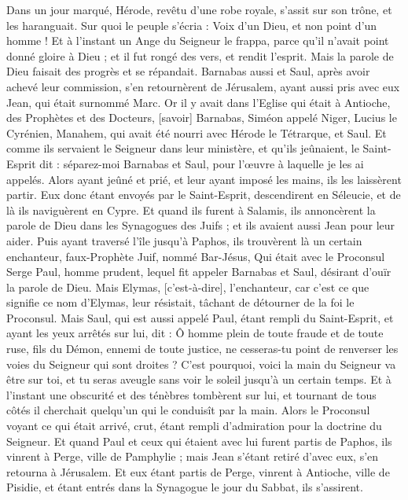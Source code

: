 \begin{multicols}{2}
Dans un jour marqué, Hérode, revêtu d'une robe royale, s'assit sur son trône, et les haranguait.
Sur quoi le peuple s'écria : Voix d'un Dieu, et non point d'un homme !
Et à l'instant un Ange du Seigneur le frappa, parce qu'il n'avait point donné gloire à Dieu ; et il fut rongé des vers, et rendit l'esprit.
Mais la parole de Dieu faisait des progrès et se répandait.
Barnabas aussi et Saul, après avoir achevé leur commission, s'en retournèrent de Jérusalem, ayant aussi pris avec eux Jean, qui était surnommé Marc.
\VerseOne{}Or il y avait dans l'Eglise qui était à Antioche, des Prophètes et des Docteurs, [savoir] Barnabas, Siméon appelé Niger, Lucius le Cyrénien, Manahem, qui avait été nourri avec Hérode le Tétrarque, et Saul.
Et comme ils servaient le Seigneur dans leur ministère, et qu'ils jeûnaient, le Saint-Esprit dit : séparez-moi Barnabas et Saul, pour l'œuvre à laquelle je les ai appelés.
Alors ayant jeûné et prié, et leur ayant imposé les mains, ils les laissèrent partir.
Eux donc étant envoyés par le Saint-Esprit, descendirent en Séleucie, et de là ils naviguèrent en Cypre.
Et quand ils furent à Salamis, ils annoncèrent la parole de Dieu dans les Synagogues des Juifs ; et ils avaient aussi Jean pour leur aider.
Puis ayant traversé l'île jusqu'à Paphos, ils trouvèrent là un certain enchanteur, faux-Prophète Juif, nommé Bar-Jésus,
Qui était avec le Proconsul Serge Paul, homme prudent, lequel fit appeler Barnabas et Saul, désirant d'ouïr la parole de Dieu.
Mais Elymas, [c'est-à-dire], l'enchanteur, car c'est ce que signifie ce nom d'Elymas, leur résistait, tâchant de détourner de la foi le Proconsul.
Mais Saul, qui est aussi appelé Paul, étant rempli du Saint-Esprit, et ayant les yeux arrêtés sur lui, dit :
Ô homme plein de toute fraude et de toute ruse, fils du Démon, ennemi de toute justice, ne cesseras-tu point de renverser les voies du Seigneur qui sont droites ?
C'est pourquoi, voici la main du Seigneur va être sur toi, et tu seras aveugle sans voir le soleil jusqu'à un certain temps. Et à l'instant une obscurité et des ténèbres tombèrent sur lui, et tournant de tous côtés il cherchait quelqu'un qui le conduisît par la main.
Alors le Proconsul voyant ce qui était arrivé, crut, étant rempli d'admiration pour la doctrine du Seigneur.
Et quand Paul et ceux qui étaient avec lui furent partis de Paphos, ils vinrent à Perge, ville de Pamphylie ; mais Jean s'étant retiré d'avec eux, s'en retourna à Jérusalem.
Et eux étant partis de Perge, vinrent à Antioche, ville de Pisidie, et étant entrés dans la Synagogue le jour du Sabbat, ils s'assirent.

\end{multicols}

